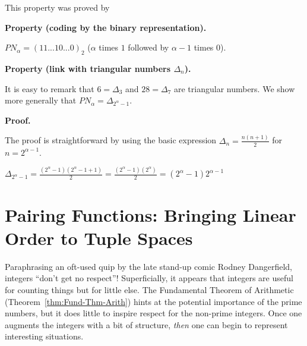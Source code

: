 This property was proved by 
\bigskip

%

\noindent
\textbf{Property (coding by the binary representation).}
\label{prop:codingPN}

$PN_\alpha = (11...10...0)_2$ ($\alpha$ times $1$ followed by $\alpha-1$ times $0$).

\medskip

\noindent
\textbf{Property (link with triangular numbers $\Delta_n$).}

\noindent 
It is easy to remark that $6=\Delta_3$ and $28=\Delta_7$ are triangular numbers.
We show more generally that $PN_\alpha = \Delta_{2^\alpha-1}$.
\medskip

\noindent 
\textbf{Proof.}

The proof is straightforward by using the basic expression $\Delta_{n} = \frac{n(n+1)}{2}$ for $n=2^{\alpha-1}$. 

$\Delta_{2^\alpha-1} = \frac{(2^\alpha-1)(2^\alpha-1+1)}{2} = \frac{(2^\alpha-1)(2^\alpha)}{2} = (2^\alpha-1)2^{\alpha-1}$



\section{Pairing Functions: Bringing Linear Order to Tuple Spaces}
\label{sec:pairing}

Paraphrasing an oft-used quip by the late stand-up comic Rodney
Dangerfield, integers ``don't get no respect''!  Superficially, it
appears that integers are useful for counting things but for little
else.  The Fundamental Theorem of Arithmetic
(Theorem~\ref{thm:Fund-Thm-Arith}) hints at the potential importance
of the prime numbers, but it does little to inspire respect for the
non-prime integers.  Once one augments the integers with a bit of
structure, {\em then} one can begin to represent interesting
situations.

